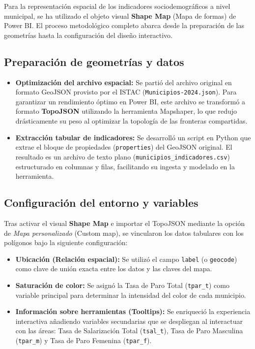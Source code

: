 \documentclass[11pt]{report}
\begin{document}
Para la representación espacial de los indicadores sociodemográficos a nivel municipal, se ha utilizado el objeto visual \textbf{Shape Map} (Mapa de formas) de Power BI. El proceso metodológico completo abarca desde la preparación de las geometrías hasta la configuración del diseño interactivo.

\subsection{Preparación de geometrías y datos}
\begin{itemize}
    \item \textbf{Optimización del archivo espacial:} Se partió del archivo original en formato GeoJSON provisto por el ISTAC (\texttt{Municipios-2024.json}). Para garantizar un rendimiento óptimo en Power BI, este archivo se transformó a formato \textbf{TopoJSON} utilizando la herramienta Mapshaper, lo que redujo drásticamente su peso al optimizar la topología de las fronteras compartidas.
    \item \textbf{Extracción tabular de indicadores:} Se desarrolló un script en Python que extrae el bloque de propiedades (\texttt{properties}) del GeoJSON original. El resultado es un archivo de texto plano (\texttt{municipios\_indicadores.csv}) estructurado en columnas y filas, facilitando su ingesta y modelado en la herramienta.
\end{itemize}

\subsection{Configuración del entorno y variables}
Tras activar el visual \textbf{Shape Map} e importar el TopoJSON mediante la opción de \textit{Mapa personalizado} (Custom map), se vincularon los datos tabulares con los polígonos bajo la siguiente configuración:

\begin{itemize}
    \item \textbf{Ubicación (Relación espacial):} Se utilizó el campo \texttt{label} (o \texttt{geocode}) como clave de unión exacta entre los datos y las claves del mapa.
    \item \textbf{Saturación de color:} Se asignó la Tasa de Paro Total (\texttt{tpar\_t}) como variable principal para determinar la intensidad del color de cada municipio.
    \item \textbf{Información sobre herramientas (Tooltips):} Se enriqueció la experiencia interactiva añadiendo variables secundarias que se despliegan al interactuar con las áreas: Tasa de Salarización Total (\texttt{tsal\_t}), Tasa de Paro Masculina (\texttt{tpar\_m}) y Tasa de Paro Femenina (\texttt{tpar\_f}).
\end{itemize}
\end{document}
